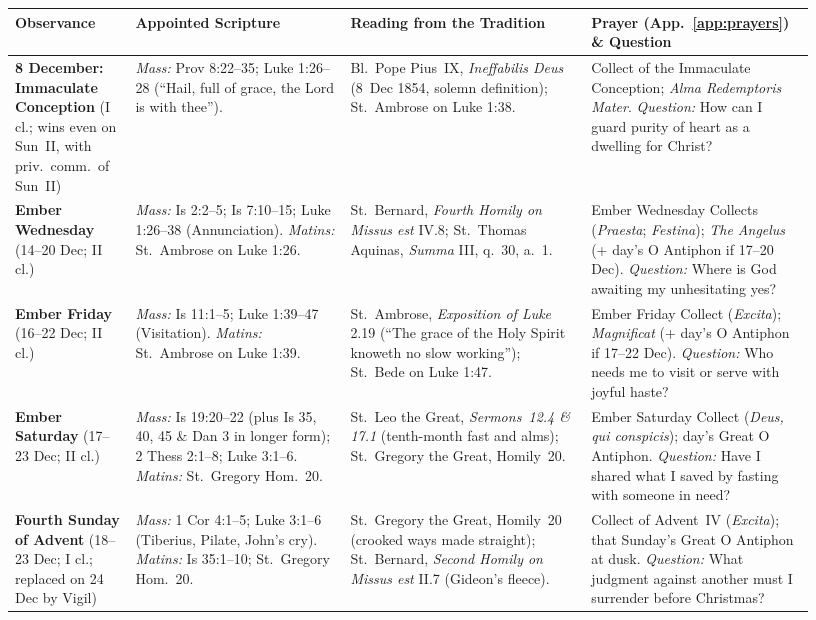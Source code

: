{\footnotesize
\begin{longtable}{>{\raggedright\arraybackslash}p{0.14\linewidth}>{\raggedright\arraybackslash}p{0.25\linewidth}>{\raggedright\arraybackslash}p{0.28\linewidth}>{\raggedright\arraybackslash}p{0.26\linewidth}}
\toprule
\textbf{Observance} & \textbf{Appointed Scripture} & \textbf{Reading from the Tradition} & \textbf{Prayer (App.~\ref{app:prayers}) \& Question}\\
\midrule
\endhead
\textbf{8 December: Immaculate Conception} (I cl.; wins even on Sun~II, with priv.~comm.~of Sun~II) & \textit{Mass:} Prov 8:22--35; Luke 1:26--28 (``Hail, full of grace, the Lord is with thee''). & Bl.~Pope Pius~IX, \textit{Ineffabilis Deus} (8~Dec 1854, solemn definition); St.~Ambrose on Luke 1:38. & Collect of the Immaculate Conception; \textit{Alma Redemptoris Mater}. \textit{Question:} How can I guard purity of heart as a dwelling for Christ?\\
\textbf{Ember Wednesday} (14--20 Dec; II cl.) & \textit{Mass:} Is 2:2--5; Is 7:10--15; Luke 1:26--38 (Annunciation). \textit{Matins:} St.~Ambrose on Luke 1:26. & St.~Bernard, \textit{Fourth Homily on Missus est} IV.8; St.~Thomas Aquinas, \textit{Summa} III, q.~30, a.~1. & Ember Wednesday Collects (\textit{Praesta}; \textit{Festina}); \textit{The Angelus} (+ day's O Antiphon if 17--20 Dec). \textit{Question:} Where is God awaiting my unhesitating yes?\\
\textbf{Ember Friday} (16--22 Dec; II cl.) & \textit{Mass:} Is 11:1--5; Luke 1:39--47 (Visitation). \textit{Matins:} St.~Ambrose on Luke 1:39. & St.~Ambrose, \textit{Exposition of Luke} 2.19 (``The grace of the Holy Spirit knoweth no slow working''); St.~Bede on Luke 1:47. & Ember Friday Collect (\textit{Excita}); \textit{Magnificat} (+ day's O Antiphon if 17--22 Dec). \textit{Question:} Who needs me to visit or serve with joyful haste?\\
\textbf{Ember Saturday} (17--23 Dec; II cl.) & \textit{Mass:} Is 19:20--22 (plus Is 35, 40, 45 \& Dan 3 in longer form); 2 Thess 2:1--8; Luke 3:1--6. \textit{Matins:} St.~Gregory Hom.~20. & St.~Leo the Great, \textit{Sermons~12.4 \& 17.1} (tenth-month fast and alms); St.~Gregory the Great, Homily~20. & Ember Saturday Collect (\textit{Deus, qui conspicis}); day's Great O Antiphon. \textit{Question:} Have I shared what I saved by fasting with someone in need?\\
\textbf{Fourth Sunday of Advent} (18--23 Dec; I cl.; replaced on 24 Dec by Vigil) & \textit{Mass:} 1 Cor 4:1--5; Luke 3:1--6 (Tiberius, Pilate, John's cry). \textit{Matins:} Is 35:1--10; St.~Gregory Hom.~20. & St.~Gregory the Great, Homily~20 (crooked ways made straight); St.~Bernard, \textit{Second Homily on Missus est} II.7 (Gideon's fleece). & Collect of Advent~IV (\textit{Excita}); that Sunday's Great O Antiphon at dusk. \textit{Question:} What judgment against another must I surrender before Christmas?\\
\bottomrule
\end{longtable}
}


